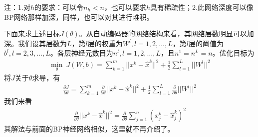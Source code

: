         注：1.对$h$的要求：可以令$n_h < n$，也可以要求$h$具有稀疏性；2.此网络深度可以像BP网络那样加深，同样，也可以对其进行堆积。
        \par
        下面来求上述目标$J(\theta)$。从自动编码器的网络结构来看，其网络层数明显可以加深。我们设其层数为$L$，第$l$层的权重为$W^{l},l=1,2,\dots,L$，第$l$层的阈值为$b^{l},l=2,3,\dots,L$。各层神经元数目为$n^{l},l=1,2,\dots,L$，且$n^{1} = n^{L} = n$。优化目标为
        \begin{align*}
        \min_\theta\ J(W,b) = \sum_{k=1}^m ||x^k - \hat{x}^k||^2 + \frac{1}{2}\sum_{l=1}^L||W^l||^2
        \end{align*}
        将$J$关于$\theta$求导，有
        \begin{align*}
        \frac{\partial J}{\partial \theta} = \sum_{k=1}^m\frac{\partial }{\partial \theta}||x^{k} - \hat{x}^k||^2 + \frac{1}{2}\sum_{l=1}^L \frac{\partial }{\partial \theta}||W^l||^2
        \end{align*}
        我们来看
        \begin{align*}
        \frac{\partial }{\partial \theta}||x^{k} - \hat{x}^k||^2  = \frac{\partial }{\partial \theta}\sum_{j=1}^{n}(x_j^k - \hat{x}_j^k)^2
        \end{align*}
        其解法与前面的BP神经网络相似，这里就不再介绍了。
